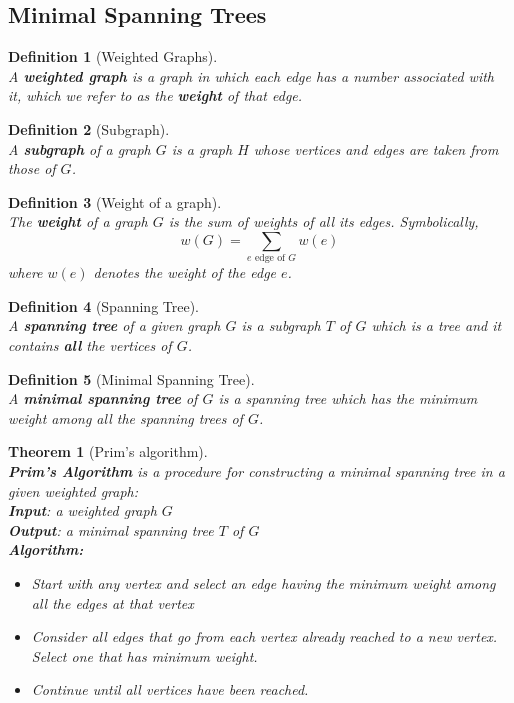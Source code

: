 \documentclass[12pt]{article}
\newtheorem{definition}{Definition}[section]
\newtheorem{theorem}{Theorem}[section]
\theoremstyle{definition}
\begin{document}
\subsection{Minimal Spanning Trees}
\begin{definition}[Weighted Graphs]
\hfill\\\normalfont A \textbf{weighted graph} is a graph in which each edge has a number associated with it, which we refer to as the \textbf{weight} of that edge.
\end{definition}
\begin{definition}[Subgraph]
\hfill\\\normalfont A \textbf{subgraph} of a graph $G$ is a graph $H$ whose vertices and edges are taken from those of $G$.
\end{definition}
\begin{definition}[Weight of a graph]
\hfill\\\normalfont The \textbf{weight} of a graph $G$ is the sum of weights of all its edges. Symbolically,
\[
w(G) = \sum_{e\text{ edge of }G}w(e)
\]
where $w(e)$ denotes the weight of the edge $e$.
\end{definition}
\begin{definition}[Spanning Tree]
\hfill\\\normalfont A \textbf{spanning tree} of a given graph $G$ is a subgraph $T$ of $G$ which is a tree and it contains \textbf{all} the vertices of $G$.
\end{definition}
\begin{definition}[Minimal Spanning Tree]
\hfill\\\normalfont A \textbf{minimal spanning tree} of $G$ is a spanning tree which has the \textit{minimum weight} among all the spanning trees of $G$.
\end{definition} 
\begin{theorem}[Prim's algorithm]
\hfill\\\normalfont \textbf{Prim's Algorithm} is a procedure for constructing a minimal spanning tree in a given weighted graph:\\
\textbf{Input}: a weighted graph $G$\\
\textbf{Output}: a minimal spanning tree $T$ of $G$\\
\textbf{Algorithm:}
\begin{itemize}
  \item Start with any vertex and select an edge having the minimum weight among all the edges at that vertex
  \item Consider \textit{all} edges that go from each vertex already reached to a new vertex.\\Select one that has \textit{minimum weight}.
  \item Continue until all vertices have been reached.
\end{itemize}
\end{theorem}
\end{document}
